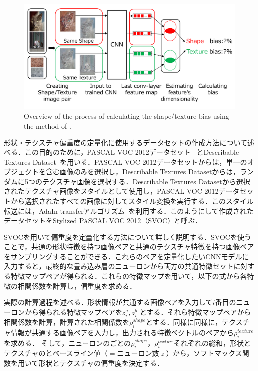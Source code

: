\begin{figure}[t]
\centering
\includegraphics[width=1\columnwidth]{fig/fig2.pdf}
\caption{
Overview of the process of calculating the shape/texture bias using the method of \cite{Islam}.
}
\label{fig:fig3}
\end{figure}

形状・テクスチャ偏重度の定量化に使用するデータセットの作成方法について述べる．この目的のために，PASCAL VOC 2012データセット~\cite{pascal-voc-2012} とDescribable Textures Dataset~\cite{cimpoi14describing}を用いる．PASCAL VOC 2012データセットからは，単一のオブジェクトを含む画像のみを選択し，Describable Textures Datasetからは，ランダムに5つのテクスチャ画像を選択する．Describable Textures Datasetから選択されたテクスチャ画像をスタイルとして使用し，PASCAL VOC 2012データセットから選択されたすべての画像に対してスタイル変換を実行する．このスタイル転送には，AdaIn transferアルゴリズム~\cite{AdaIn}を利用する．このようにして作成されたデータセットをStylized PASCAL VOC 2012（SVOC）と呼ぶ．

SVOCを用いて偏重度を定量化する方法について詳しく説明する．SVOCを使うことで，共通の形状特徴を持つ画像ペアと共通のテクスチャ特徴を持つ画像ペアをサンプリングすることができる．これらのペアを定量化したいCNNモデルに入力すると，最終的な畳み込み層のニューロンから両方の共通特徴セットに対する特徴マップペアが得られる．これらの特徴マップを用いて，以下の式から各特徴の相関係数を計算し，偏重度を求める．

実際の計算過程を述べる．形状情報が共通する画像ペアを入力して$i$番目のニューロンから得られる特徴マップペアを$z^a_i, z^b_i$ とする．それら特徴マップペアから相関係数を計算，計算された相関係数を$\rho_i^{shape}$とする．同様に同様に，テクスチャ情報が共通する画像ペアを入力し，出力される特徴ベクトルのペアから$\rho_i^{texture}$を求める．
そして，ニューロンのごとの$\rho_i^{shape}$，$\rho_i^{texture}$それぞれの総和，形状とテクスチャのとベースライン値（$=ニューロン数|z|$）から，ソフトマックス関数を用いて形状とテクスチャの偏重度を決定する．

